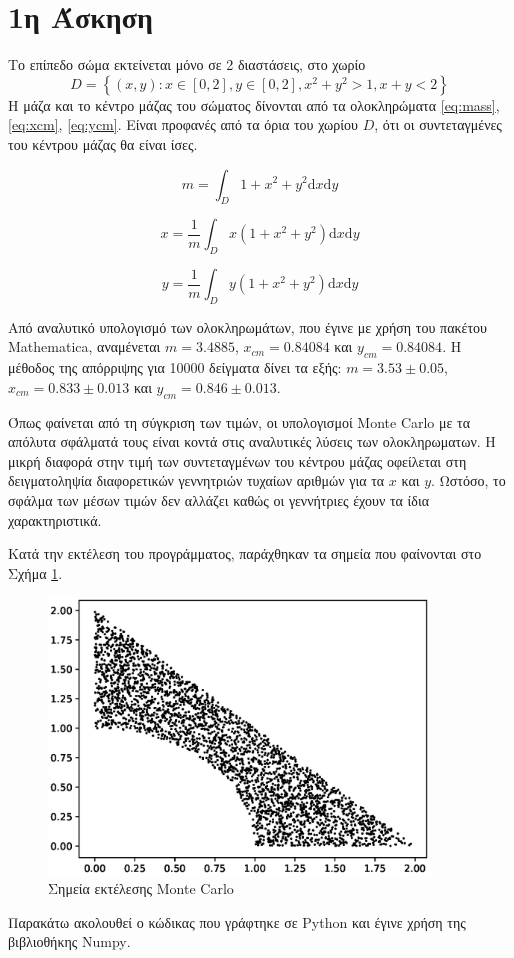 \documentclass[assignment1.tex]{subfiles}
\begin{document}
\section*{1η Άσκηση}

Το επίπεδο σώμα εκτείνεται μόνο σε 2 διαστάσεις, στο χωρίο $$D=\left\{(x,y): x\in[0,2], y\in[0,2], x^2+y^2>1, x+y<2\right\}$$ Η μάζα και το κέντρο μάζας του σώματος δίνονται από τα ολοκληρώματα \ref{eq:mass}, \ref{eq:xcm}, \ref{eq:ycm}. Είναι προφανές από τα όρια του χωρίου $D$, ότι οι συντεταγμένες του κέντρου μάζας θα είναι ίσες.

\begin{equation}
m=\int_D 1+x^2+y^2 \mathrm{d}x \mathrm{d}y
\label{eq:mass}
\end{equation}

\begin{equation}
x=\frac{1}{m}\int_D x\left(1+x^2+y^2\right) \mathrm{d}x \mathrm{d}y
\label{eq:xcm}
\end{equation}

\begin{equation}
y=\frac{1}{m}\int_D y\left(1+x^2+y^2\right) \mathrm{d}x \mathrm{d}y
\label{eq:ycm}
\end{equation}

Από αναλυτικό υπολογισμό των ολοκληρωμάτων, που έγινε με χρήση του πακέτου \textlatin{Mathematica}, αναμένεται $m=3.4885$, $x_{cm}=0.84084$ και $y_{cm}=0.84084$. Η μέθοδος της απόρριψης για 10000 δείγματα δίνει τα εξής: $m=3.53\pm0.05$, $x_{cm}=0.833\pm0.013$ και $y_{cm}=0.846\pm0.013$. 

Όπως φαίνεται από τη σύγκριση των τιμών, οι υπολογισμοί \textlatin{Monte Carlo} με τα απόλυτα σφάλματά τους είναι κοντά στις αναλυτικές λύσεις των ολοκληρωματων. Η μικρή διαφορά στην τιμή των συντεταγμένων του κέντρου μάζας οφείλεται στη δειγματοληψία διαφορετικών γεννητριών τυχαίων αριθμών για τα $x$ και $y$. Ωστόσο, το σφάλμα των μέσων τιμών δεν αλλάζει καθώς οι γεννήτριες έχουν τα ίδια χαρακτηριστικά.

Κατά την εκτέλεση του προγράμματος, παράχθηκαν τα σημεία που φαίνονται στο Σχήμα \ref{fig:rejection}.

\begin{figure}[hp]
\includegraphics[width=0.9\textwidth]{rejection.eps}
\centering
\caption{Σημεία εκτέλεσης \textlatin{Monte Carlo}}
\label{fig:rejection}
\end{figure} 

\FloatBarrier

Παρακάτω ακολουθεί ο κώδικας που γράφτηκε σε \textlatin{Python} και έγινε χρήση της βιβλιοθήκης \textlatin{Numpy}.


\end{document}
